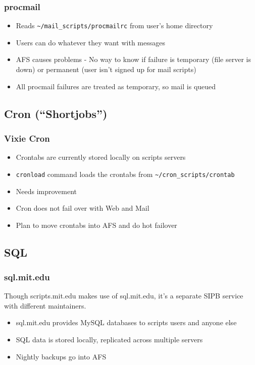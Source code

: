 \begin{frame}[fragile]
  \frametitle{procmail}
  \begin{itemize}
    \item Reads \verb|~/mail_scripts/procmailrc| from user's home directory
    \item Users can do whatever they want with messages
    \item AFS causes problems - No way to know if failure is temporary (file server is down) or permanent (user isn't signed up for mail scripts)
    \item All procmail failures are treated as temporary, so mail is queued
  \end{itemize}
\end{frame}

\subsection{Cron (``Shortjobs'')}

\begin{frame}[fragile]
  \frametitle{Vixie Cron}
  \begin{itemize}
    \item Crontabs are currently stored locally on scripts servers
    \item {\tt cronload} command loads the crontabs from
      \verb|~/cron_scripts/crontab| \pause
    \item Needs improvement
    \item Cron does not fail over with Web and Mail
    \item Plan to move crontabs into AFS and do hot failover
  \end{itemize}
\end{frame}

\subsection{SQL}

\begin{frame}
  \frametitle{sql.mit.edu}
  Though scripts.mit.edu makes use of sql.mit.edu, it's a separate SIPB service with different maintainers.
\begin{itemize}
\item sql.mit.edu provides MySQL databases to scripts users and anyone else
\item SQL data is stored locally, replicated across multiple servers
\item Nightly backups go into AFS
\end{itemize}
\end{frame}
